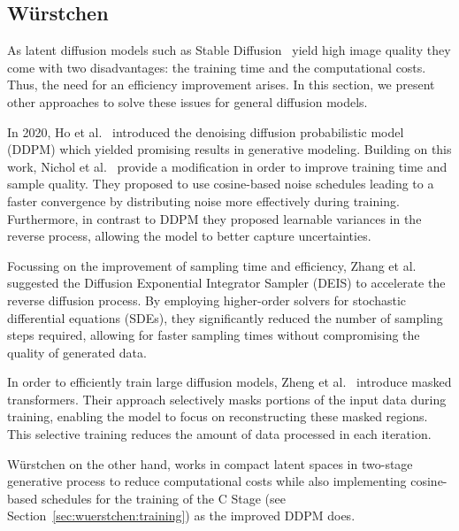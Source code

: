 \subsection{W\"urstchen}
As latent diffusion models such as Stable
Diffusion~\cite{rombach2022stablediffusion} yield high image quality they come
with two disadvantages: the training time and the computational costs. Thus,
the need for an efficiency improvement arises. In this section, we present other
approaches to solve these issues for general diffusion models.

In 2020, Ho et al.~\cite{ho2020denoisingdiffusionprobabilisticmodels} introduced
the  denoising diffusion probabilistic model (DDPM) which yielded promising
results in generative modeling. Building on this work, Nichol et
al.~\cite{Nichol2021ImprovedDenoisingDiffusionProbabilisticModels} provide a
modification in order to improve training time and sample quality. They
proposed to use cosine-based noise schedules leading to a faster
convergence by distributing noise more effectively during training.
Furthermore, in contrast to DDPM they proposed learnable variances in the
reverse process, allowing the model to better capture uncertainties.

Focussing on the improvement of sampling time and efficiency,
Zhang et al.~\cite{zhang2023fastsamplingdiffusionmodels} suggested the
Diffusion Exponential Integrator Sampler (DEIS) to accelerate the reverse
diffusion process. By employing higher-order solvers for stochastic
differential equations (SDEs), they significantly reduced the number of
sampling steps required, allowing for faster sampling times without
compromising the quality of generated data.

In order to efficiently train large diffusion models, Zheng et
al.~\cite{zheng2024fast} introduce masked transformers. Their approach
selectively masks portions of the input data during training, enabling the
model to focus on reconstructing these masked regions. This selective training
reduces the amount of data processed in each iteration.

W\"urstchen on the other hand, works in compact latent spaces in two-stage
generative process to reduce computational costs while also implementing
cosine-based schedules for the training of the C Stage (see
Section~\ref{sec:wuerstchen:training}) as the improved DDPM does.